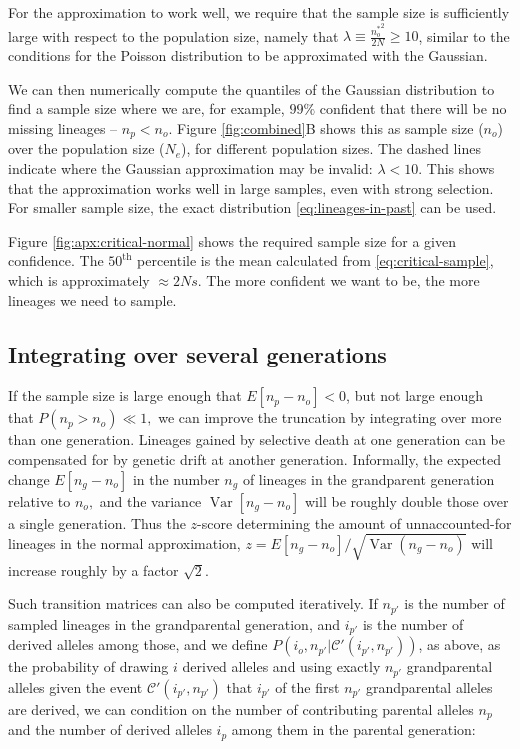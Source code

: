\documentclass[review]{elsarticle}
\begin{document}
For the approximation to work well, we require that the sample size is sufficiently large with
respect to the population size, namely that $\lambda \equiv \frac{{n_o^*}^2}{2N} \ge 10$, similar to
the conditions for the Poisson distribution to be approximated with the Gaussian.

We can then numerically compute the quantiles of the Gaussian distribution to find a sample size
where we are, for example, $99\%$ confident that there will be no missing lineages -- $n_p < n_o$.
Figure \ref{fig:combined}B shows this as sample size ($n_o$) over the population size ($N_e$), for
different population sizes. The dashed lines indicate where the Gaussian approximation may be
invalid: $\lambda < 10$. This shows that the approximation works well in large samples, even with
strong selection. For smaller sample size, the exact distribution \eqref{eq:lineages-in-past} can be used.

Figure \ref{fig:apx:critical-normal} shows the required sample size for a given confidence. The
$50^\text{th}$ percentile is the mean calculated from \eqref{eq:critical-sample}, which is
approximately $\approx 2Ns$. The more confident we want to be, the more lineages we need to sample.

\subsection{Integrating over several generations} 

If the sample size is large enough that $E[n_p-n_o]<0$, but not large enough that
$P(n_p>n_o) \ll 1,$ we can improve the truncation by integrating over more than one generation.
Lineages gained by selective death at one generation can be compensated for by genetic drift at
another generation. Informally, the expected change $E[n_g-n_o]$ in the number $n_g$ of lineages in
the grandparent generation relative to $n_o,$ and the variance $\operatorname{Var}[n_g-n_o]$ will be
roughly double those over a single generation. Thus the $z$-score determining the amount of
unnaccounted-for lineages in the normal approximation,
$z= E[n_g-n_o] / \sqrt{\operatorname{Var}(n_g-n_o)}$ will increase roughly by a factor $\sqrt{2}$.

Such transition matrices can also be computed iteratively. If $n_{p'}$ is the number of sampled
lineages in the grandparental generation, and $i_{p'}$ is the number of derived alleles among those,
and we define $P(i_o, n_{p'} | \mathcal{C}'(i_{p'}, n_{p'}))$, as above, as the probability of
drawing $i$ derived alleles and using exactly $n_{p'}$ grandparental alleles given the event
$\mathcal{C'}(i_{p'}, n_{p'})$ that $i_{p'}$ of the first $n_{p'}$ grandparental alleles are
derived, we can condition on the number of contributing parental alleles $n_p$ and the number of
derived alleles $i_p$ among them in the parental generation:
\end{document}
